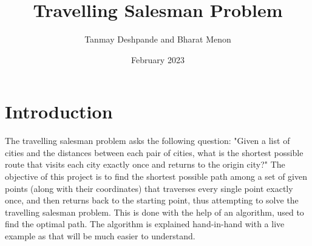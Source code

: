 \documentclass{article}
\title{Travelling Salesman Problem}
\author{Tanmay Deshpande and Bharat Menon}
\date{February 2023}
\begin{document}
    \pagecolor{base}
    \color{text}
\maketitle

\section{Introduction}
The travelling salesman problem asks the following question:
"Given a list of cities and the distances between each pair of cities,
what is the shortest possible route that visits each city exactly once
and returns to the origin city?"
The objective of this project is to find the shortest possible path
among a set of given points (along with their coordinates) that
traverses every single point exactly once, and then returns back to the
starting point, thus attempting to solve the travelling salesman
problem.
This is done with the help of an algorithm, used to find the optimal
path. The algorithm is explained hand-in-hand with a live example as
that will be much easier to understand.
\end{document}

